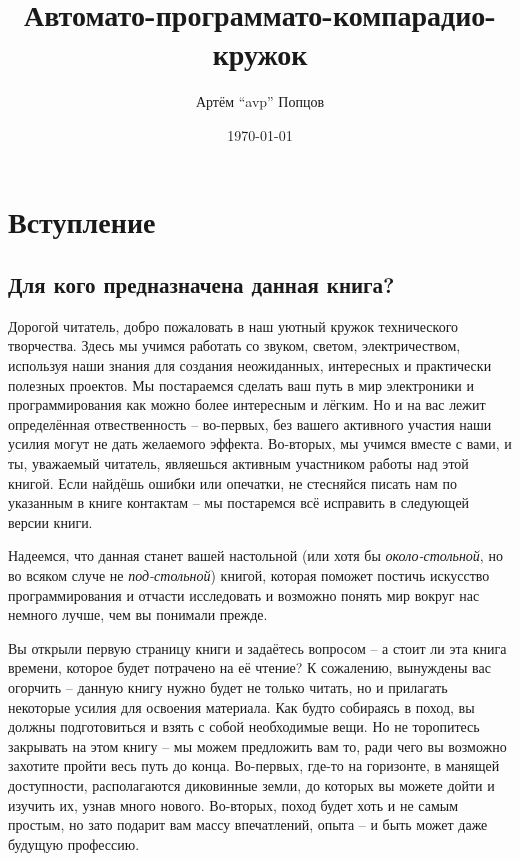 \documentclass[a4paper,twoside]{book}
\title{Автомато-программато-компарадио-кружок}
\author{Артём ``avp'' Попцов}
\date{\today}
\begin{document}
\maketitle

\tableofcontents

\chapter*{Вступление}

\section{Для кого предназначена данная книга?}
Дорогой читатель, добро пожаловать в наш уютный кружок технического творчества.
Здесь мы учимся работать со звуком, светом, электричеством, используя наши
знания для создания неожиданных, интересных и практически полезных проектов. Мы
постараемся сделать ваш путь в мир электроники и программирования как можно
более интересным и лёгким. Но и на вас лежит определённая отвественность --
во-первых, без вашего активного участия наши усилия могут не дать желаемого
эффекта. Во-вторых, мы учимся вместе с вами, и ты, уважаемый читатель, являешься
активным участником работы над этой книгой. Если найдёшь ошибки или опечатки, не
стесняйся писать нам по указанным в книге контактам -- мы постаремся всё
исправить в следующей версии книги.

Надеемся, что данная станет вашей настольной (или хотя бы \emph{около-стольной},
но во всяком случе не \emph{под-стольной}) книгой, которая поможет постичь
искусство программирования и отчасти исследовать и возможно понять мир вокруг
нас немного лучше, чем вы понимали прежде.

Вы открыли первую страницу книги и задаётесь вопросом -- а стоит ли эта книга
времени, которое будет потрачено на её чтение? К сожалению, вынуждены вас
огорчить -- данную книгу нужно будет не только читать, но и прилагать некоторые
усилия для освоения материала. Как будто собираясь в поход, вы должны
подготовиться и взять с собой необходимые вещи. Но не торопитесь закрывать на
этом книгу -- мы можем предложить вам то, ради чего вы возможно захотите пройти
весь путь до конца. Во-первых, где-то на горизонте, в манящей доступности,
располагаются диковинные земли, до которых вы можете дойти и изучить их, узнав
много нового. Во-вторых, поход будет хоть и не самым простым, но зато подарит
вам массу впечатлений, опыта -- и быть может даже будущую профессию.
\end{document}
